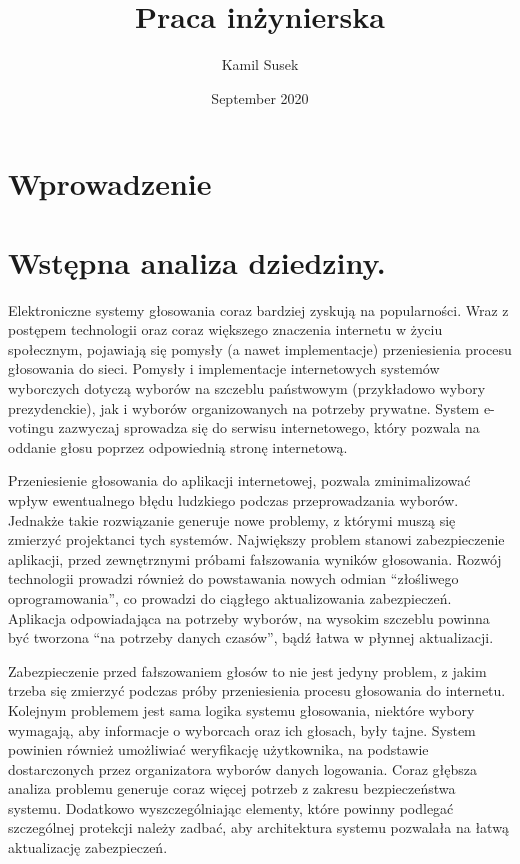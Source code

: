 \documentclass[a4paper,13pt]{report}
\begin{document}
\begin{titlepage}

\title{Praca inżynierska}
\author{Kamil Susek}
\date{September 2020}

\maketitle
\end{titlepage}
\chapter{Wprowadzenie}



\newpage

\chapter{Wstępna analiza dziedziny.}
Elektroniczne systemy głosowania coraz bardziej zyskują na popularności.
Wraz z postępem technologii oraz coraz większego znaczenia internetu w życiu 
społecznym, pojawiają się pomysły (a nawet implementacje) przeniesienia procesu głosowania do sieci. Pomysły i implementacje internetowych systemów wyborczych dotyczą wyborów na szczeblu państwowym (przykładowo wybory prezydenckie), jak i wyborów organizowanych na potrzeby prywatne. System e-votingu zazwyczaj sprowadza się do serwisu internetowego, który pozwala na oddanie głosu poprzez odpowiednią stronę internetową. 

Przeniesienie głosowania do aplikacji internetowej, pozwala zminimalizować wpływ ewentualnego błędu ludzkiego podczas przeprowadzania wyborów. Jednakże takie rozwiązanie generuje nowe problemy, z którymi muszą się zmierzyć projektanci tych systemów. Największy problem stanowi zabezpieczenie aplikacji, przed zewnętrznymi próbami fałszowania wyników głosowania. Rozwój technologii prowadzi również do powstawania nowych odmian “złośliwego oprogramowania”, co prowadzi do ciągłego aktualizowania zabezpieczeń. Aplikacja odpowiadająca na potrzeby wyborów, na wysokim szczeblu powinna być tworzona “na potrzeby danych czasów”, bądź łatwa w płynnej aktualizacji.

Zabezpieczenie przed fałszowaniem głosów to nie jest jedyny problem, z jakim trzeba się zmierzyć podczas próby przeniesienia procesu głosowania do internetu. Kolejnym problemem jest sama logika systemu głosowania, niektóre wybory wymagają, aby informacje o wyborcach oraz ich głosach, były tajne. System powinien również umożliwiać weryfikację użytkownika, na podstawie dostarczonych przez organizatora wyborów danych logowania. Coraz głębsza analiza problemu generuje coraz więcej potrzeb z zakresu bezpieczeństwa systemu. Dodatkowo wyszczególniając elementy, które powinny podlegać szczególnej protekcji należy zadbać, aby architektura systemu pozwalała na łatwą aktualizację zabezpieczeń.
\end{document}
